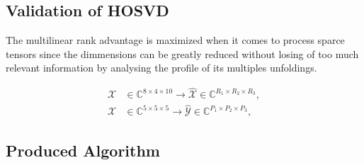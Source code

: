 \documentclass[a4paper,10pt]{article}
\begin{document}
    \subsection*{Validation of HOSVD}
    
    The multilinear rank advantage is maximized when it comes to process sparce tensors since the dimmensions can be greatly reduced without losing of too much relevant information by analysing the profile of its multiples unfoldings.

    \begin{align}
        \mathcal{X} &\in \mathbb{C}^{8 \times 4 \times 10} \to \hat{\mathcal{X}} \in \mathbb{C}^{R_{1} \times R_{2} \times R_{3}}, \\ 
        \mathcal{X} &\in \mathbb{C}^{5 \times 5 \times 5} \to \hat{\mathcal{Y}} \in \mathbb{C}^{P_{1} \times P_{2} \times P_{3}},
    \end{align}

    \newpage
    \subsection*{Produced Algorithm}
\end{document}
